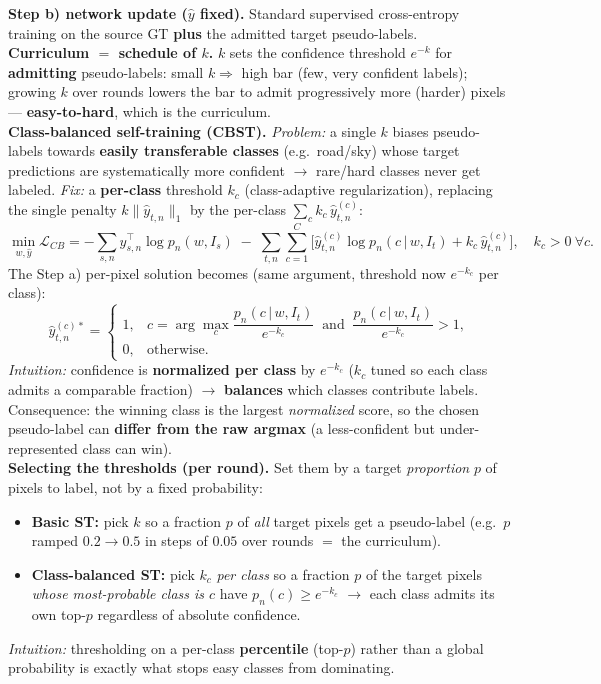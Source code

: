 \documentclass{article}
\begin{document}
\textbf{Step b) network update ($\hat y$ fixed).} Standard supervised cross-entropy training on the source GT \textbf{plus} the admitted target pseudo-labels.\\

\textbf{Curriculum $=$ schedule of $k$.} $k$ sets the confidence threshold $e^{-k}$ for \textbf{admitting} pseudo-labels: small $k\Rightarrow$ high bar (few, very confident labels); growing $k$ over rounds lowers the bar to admit progressively more (harder) pixels --- \textbf{easy-to-hard}, which is the curriculum.\\

\textbf{Class-balanced self-training (CBST).} \textit{Problem:} a single $k$ biases pseudo-labels towards \textbf{easily transferable classes} (e.g.\ road/sky) whose target predictions are systematically more confident $\rightarrow$ rare/hard classes never get labeled. \textit{Fix:} a \textbf{per-class} threshold $k_c$ (class-adaptive regularization), replacing the single penalty $k\lVert\hat y_{t,n}\rVert_1$ by the per-class $\sum_c k_c\,\hat y^{(c)}_{t,n}$:
\begin{equation*}
\min_{w,\hat y}\mathcal{L}_{CB} = -\sum_{s,n} y_{s,n}^\top\log p_n(w,I_s) \;-\; \sum_{t,n}\sum_{c=1}^C\Big[\hat y^{(c)}_{t,n}\log p_n(c\,|\,w,I_t) + k_c\,\hat y^{(c)}_{t,n}\Big],\quad k_c>0\ \forall c.
\end{equation*}
The Step a) per-pixel solution becomes (same argument, threshold now $e^{-k_c}$ per class):
\begin{equation*}
\hat y^{(c)*}_{t,n} = \begin{cases} 1, & c=\arg\max_c \dfrac{p_n(c\,|\,w,I_t)}{e^{-k_c}}\ \text{ and }\ \dfrac{p_n(c\,|\,w,I_t)}{e^{-k_c}}>1,\\[2mm] 0, & \text{otherwise}.\end{cases}
\end{equation*}
\textit{Intuition:} confidence is \textbf{normalized per class} by $e^{-k_c}$ ($k_c$ tuned so each class admits a comparable fraction) $\rightarrow$ \textbf{balances} which classes contribute labels. Consequence: the winning class is the largest \textit{normalized} score, so the chosen pseudo-label can \textbf{differ from the raw argmax} (a less-confident but under-represented class can win).\\

\textbf{Selecting the thresholds (per round).} Set them by a target \textit{proportion} $p$ of pixels to label, not by a fixed probability:
\begin{itemize}
    \item \textbf{Basic ST:} pick $k$ so a fraction $p$ of \textit{all} target pixels get a pseudo-label (e.g.\ $p$ ramped $0.2\!\to\!0.5$ in steps of $0.05$ over rounds $=$ the curriculum).
    \item \textbf{Class-balanced ST:} pick $k_c$ \textit{per class} so a fraction $p$ of the target pixels \textit{whose most-probable class is $c$} have $p_n(c)\ge e^{-k_c}$ $\rightarrow$ each class admits its own top-$p$ regardless of absolute confidence.
\end{itemize}
\textit{Intuition:} thresholding on a per-class \textbf{percentile} (top-$p$) rather than a global probability is exactly what stops easy classes from dominating.
\end{document}
